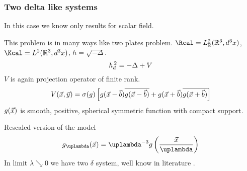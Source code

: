\documentclass[10pt,t]{beamer}
\begin{document}
\begin{frame}
  \frametitle{Two delta like systems}


  In this case we know only results for scalar field.

  This problem is in many ways like two plates problem.
  $\Rcal = L^{ 2 }_{ \Rbb }( \Rbb^{ 3 }, d^{ 3 }x )$,
  $\Kcal = L^{ 2 }( \Rbb^{ 3 }, d^{ 3 }x )$, $h = \sqrt{ -\Delta }$.
  \begin{equation}
    \label{eq:Herdegens-approach-26}
    h_{ \vec{ a } }^{ \, 2 } = -\Delta + V
  \end{equation}
  $V$ is again projection operator of finite rank.
  \begin{equation}
    \label{eq:Herdegens-approach-27}
    V( \vec{ x }, \vec{ y } ) =
    \sigma( g ) \left[ g( \vec{ x } - \vec{ b } )
      \overline{ g( \vec{ x } - \vec{ b } ) } + g( \vec{ x } + \vec{ b } )
      \overline{ g( \vec{ x } + \vec{ b } ) } \right]
  \end{equation}
  $g( \vec{ x } )$ is smooth, positive, spherical symmetric function with
  compact support.

  Rescaled version of the model
  \begin{equation}
    \label{eq:Herdegens-approach-28}
    g_{ \lambda }( \vecx ) = \lambda^{ -3 } g\left( \frac{ \vecx }{ \lambda } \right)
  \end{equation}
  In limit $\lambda \searrow 0$ we have two $\delta$ system, well know
  in literature \cite{AlbeverioEtAlSolvableModelsInQuantumMechanics1988}.

\end{frame}
\end{document}
